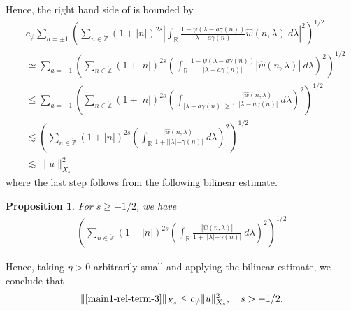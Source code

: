 \documentclass[12pt,reqno]{amsart}
\numberwithin{equation}{section}  %
\renewcommand{\cref}{\Cref}
\newcommand{\rr}{\mathbb{R}}
\newcommand{\zz}{\mathbb{Z}}
\newcommand{\zzdot}{\dot{\zz}}
\newcommand{\wh}{\widehat}
\newtheorem{proposition}[theorem]{Proposition}
\begin{document}
%
Hence, the right hand side of \cref{iu} is bounded by
%
\begin{equation}
  \begin{split}
    & c_{\psi}  \sum_{a = \pm 1}\left( \sum_{n \in \zzdot} \left (1 + |n| \right )^{2s} | \int_\rr
		\frac{1 - \psi\left( \lambda - a\gamma(n) \right)}{\lambda - a\gamma(n)}
		\wh{w}(n, \lambda) \ d\lambda |^2 \right)^{1/2}
		\\
    & \simeq  \sum_{a = \pm 1} \left( \sum_{n \in \zzdot} \left (1 + |n| \right )^{2s}  \left ( \int_\rr
		\frac{1 - \psi\left( \lambda - a\gamma(n) \right)}{|\lambda - a\gamma(n)|}
		|\wh{w}(n, \lambda) | \ d\lambda \right )^2 \right)^{1/2}
		\\
    & \le \sum_{a = \pm 1} \left( \sum_{n \in \zzdot} \left (1 + |n| \right )^{2s}  \left ( \int_{| \lambda - 
		a\gamma(n) | \ge 1}
		\frac{|\wh{w}(n, \lambda) |}{|\lambda - a\gamma(n)|}
		\ d\lambda \right )^2 \right)^{1/2}
		\\
  & \lesssim   \left( \sum_{n \in \zzdot} \left (1 + |n| \right )^{2s}  \left ( \int_\rr
    \frac{|\wh{w}(n, \lambda)|}{1 + | |\lambda| - \gamma(n)|}
    \ d\lambda \right )^2 \right)^{1/2}
    \\
    & \lesssim \| u \|_{\dot{X}_{s}}^{2}
	\end{split}
\end{equation}
%
where the last step follows from the following bilinear estimate.
%
%
%
%
%
%
%				
%
%
%
%
\begin{proposition}
For $s \ge -1/2$, we have
\begin{gather*}
\left( \sum_{n \in \zzdot} \left (1 + |n| \right )^{2s}  \left ( \int_\rr
    \frac{|\wh{w}(n, \lambda)|}{1 + | |\lambda| - \gamma(n)|}
    \ d\lambda \right )^2 \right)^{1/2}
\end{gather*}
\label{prop:bilin-endpoint}
\end{proposition}
%
%
%
Hence, taking $\eta > 0$ arbitrarily small
and applying the bilinear estimate, we conclude that 
%
%
\begin{equation}
  \label{main-int3-est}
	\begin{split}
    \|\cref{main1-rel-term-3}\|_{X_{s}} \le c_{\psi} 
     \|u\|^{2}_{X_{s}}, \quad   s > -1/2.
	\end{split}
\end{equation}

%
%
%
\end{document}
